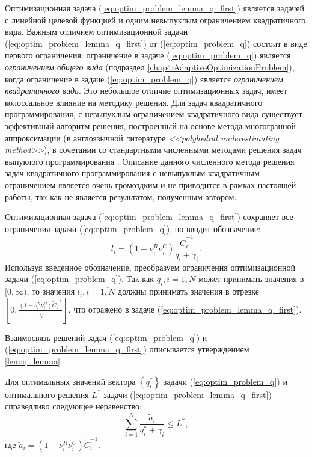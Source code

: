 Оптимизационная задача (\ref{eq:optim_problem_lemma_q_first}) является задачей с линейной целевой функцией и одним невыпуклым ограничением квадратичного вида. Важным отличием оптимизационной задачи (\ref{eq:optim_problem_lemma_q_first}) от (\ref{eq:optim_problem_q}) состоит в виде первого ограничения: ограничение в задаче (\ref{eq:optim_problem_q}) является \textit{ограничением общего вида} (подраздел \ref{chap4:AdaptiveOptimizationProblem}), когда ограничение в задаче (\ref{eq:optim_problem_q}) является \textit{ограничением квадратичного вида}. Это небольшое отличие оптимизационных задач, имеет колоссальное влияние на методику решения. Для задач квадратичного программирования, с невыпуклым ограничением квадратичного вида существует эффективный алгоритм решения, построенный на основе метода многогранной аппроксимации (в англоязычной литературе \textit{<<polyhedral underestimating method>>}), в сочетании со стандартными численными методами решения задач выпуклого программирования \cite{Zheng2011}. Описание данного численного метода решения задач квадратичного программирования с невыпуклым квадратичным ограничением является очень громоздким и не приводится в рамках настоящей работы, так как не является результатом, полученным автором.

Оптимизационная задача (\ref{eq:optim_problem_lemma_q_first}) сохраняет все ограничения задачи (\ref{eq:optim_problem_q}), но вводит обозначение:
$$l_i = \left(1-\nu^R_i\nu^C_i\right)\frac{\tilde{C}^{-1}_i }{q_i + \gamma_i}.$$
Используя введенное обозначение, преобразуем ограничения оптимизационной задачи (\ref{eq:optim_problem_q}). Так как $q_i, i = \overline{1,N}$ может принимать значения в $[0, \infty)$, то значения $l_i, i = \overline{1,N}$ должны принимать значения в отрезке $\left[0, \frac{\left(1-\nu^R_i\nu^C_i\right)\tilde{C}^{-1}_i }{\gamma_i}\right]$, что отражено в задаче (\ref{eq:optim_problem_lemma_q_first}).

Взаимосвязь решений задач (\ref{eq:optim_problem_q}) и (\ref{eq:optim_problem_lemma_q_first}) описывается утверждением \ref{lem:q_lemma}.

\begin{lemma}
\label{lem:q_lemma}
Для оптимальных значений вектора $\left\{q^{*}_i\right\}$ задачи (\ref{eq:optim_problem_q}) и оптимального решения $L^{*}$ задачи (\ref{eq:optim_problem_lemma_q_first}) справедливо следующее неравенство:
$$\sum\limits_{i=1}^{N} {\frac{\tilde{a}_i}{q^{*}_i + \gamma_i}} \leq L^{*},$$
где $\tilde{a}_i = \left(1-\nu^R_i\nu^C_i\right)\tilde{C}^{-1}_i$.
\end{lemma}

